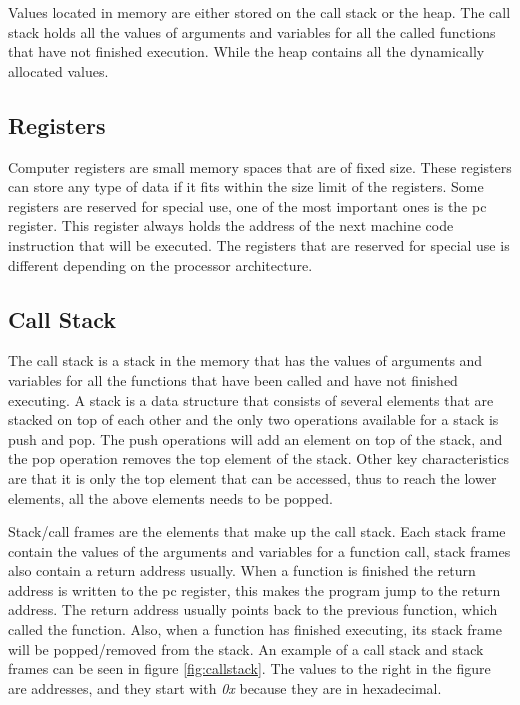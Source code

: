 Values located in memory are either stored on the call stack or the heap.
The call stack holds all the values of arguments and variables for all the called functions that have not finished execution.
While the heap contains all the dynamically allocated values.


\subsection{Registers}
Computer registers are small memory spaces that are of fixed size.
These registers can store any type of data if it fits within the size limit of the registers.
Some registers are reserved for special use, one of the most important ones is the \acrfull{pc} register.
This register always holds the address of the next machine code instruction that will be executed.
The registers that are reserved for special use is different depending on the processor architecture.


\subsection{Call Stack}
\label{sec:callstack}
The call stack is a stack in the memory that has the values of arguments and variables for all the functions that have been called and have not finished executing.
A stack is a data structure that consists of several elements that are stacked on top of each other and the only two operations available for a stack is push and pop.
The push operations will add an element on top of the stack, and the pop operation removes the top element of the stack.
Other key characteristics are that it is only the top element that can be accessed, thus to reach the lower elements, all the above elements needs to be popped.


Stack/call frames are the elements that make up the call stack.
Each stack frame contain the values of the arguments and variables for a function call, stack frames also contain a return address usually.
When a function is finished the return address is written to the \acrshort{pc} register, this makes the program jump to the return address.
The return address usually points back to the previous function, which called the function.
Also, when a function has finished executing, its stack frame will be popped/removed from the stack.
An example of a call stack and stack frames can be seen in figure \ref{fig:callstack}.
The values to the right in the figure are addresses, and they start with \emph{0x} because they are in hexadecimal.


